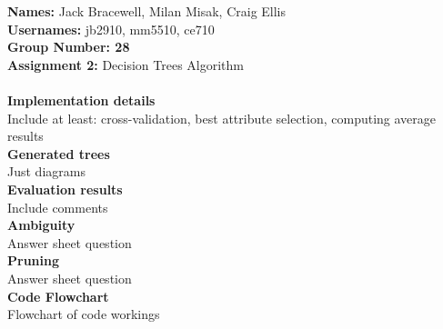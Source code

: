 \documentclass[12pt]{article}
\begin{document}
{\bf Names:} Jack Bracewell, Milan Misak, Craig Ellis\\
{\bf Usernames:} jb2910, mm5510, ce710 \\
{\bf Group Number: 28}  \\

{\bf Assignment 2:} Decision Trees Algorithm \\ \\

{\bf Implementation details} \\
Include at least: cross-validation, best attribute selection, computing average results\\

{\bf Generated trees} \\
Just diagrams \\

{\bf Evaluation results} \\
Include comments \\

{\bf Ambiguity} \\
Answer sheet question \\

{\bf Pruning} \\
Answer sheet question\\

{\bf Code Flowchart} \\
Flowchart of code workings\\
\end{document}
